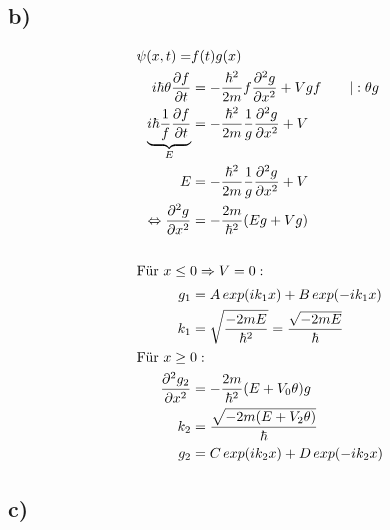 \subsection{b)}

    \begin{align*}
        \psi(x, t) =& f(t) g(x)\\
        i\hbar \theta \frac{\partial f}{\partial t} &= -\frac{\hbar^2}{2m} f \frac{\partial^2 g}{\partial x^2} + V g f \qquad \vert :\theta g\\
        \underbrace{i\hbar \frac{1}{f} \frac{\partial f}{\partial t}}_{E} &= -\frac{\hbar^2}{2m} \frac{1}{g} \frac{\partial^2 g}{\partial x^2} + V\\
        E &= -\frac{\hbar^2}{2m} \frac{1}{g} \frac{\partial^2 g}{\partial x^2} + V\\
        \Leftrightarrow \frac{\partial^2 g}{\partial x^2} &= -\frac{2m}{\hbar^2} (Eg + Vg)\\
        \\
        \intertext{Für $x \leq 0 \Rightarrow V=0:$
        }
        g_1 &= A \, exp(ik_1x) + B \, exp(-ik_1x)\\
        k_1 &= \sqrt{\frac{-2mE}{\hbar^2}} = \frac{\sqrt{-2mE}}{\hbar}\\
        \intertext{Für $x \geq 0:$
        }
        \frac{\partial^2 g_2}{\partial x^2} &= -\frac{2m}{\hbar^2}(E + V_0 \theta)g\\
        k_2 &= \frac{\sqrt{-2m(E+V_2 \theta)}}{\hbar}\\
        g_2 &= C \, exp(ik_2x) + D \, exp(-ik_2x)
    \end{align*}

\subsection{c)}

